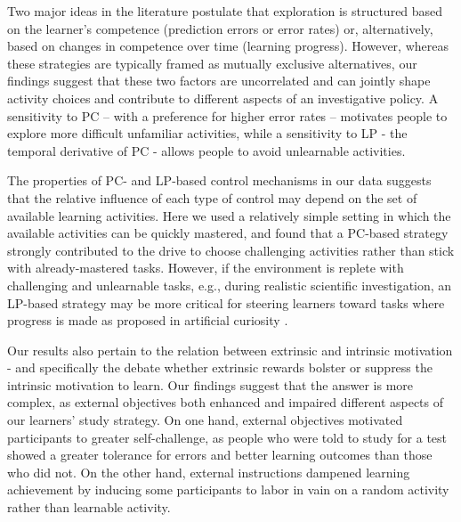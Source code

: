 Two major ideas in the literature postulate that exploration is structured based on the learner’s competence (prediction errors or error rates) or, alternatively, based on changes in competence over time (learning progress). However, whereas these strategies are typically framed as mutually exclusive alternatives, \parencite{kaplan2003motivational,kaplan_search_2007,mirolli_functions_2013,santucci_which_2013} our findings suggest that these two factors are uncorrelated and can jointly shape activity choices and contribute to different aspects of an investigative policy. A sensitivity to \ac{PC} -- with a preference for higher error rates -- motivates people to explore more difficult unfamiliar activities, while a sensitivity to \ac{LP} - the temporal derivative of \ac{PC}  - allows people to avoid unlearnable activities. 

The properties of \ac{PC}- and \ac{LP}-based control mechanisms in our data suggests that the relative influence of each type of control may depend on the set of available learning activities. Here we used a relatively simple setting in which the available activities can be quickly mastered, and found that a \ac{PC}-based strategy strongly contributed to the drive to choose challenging activities rather than stick with already-mastered tasks. However, if the environment is replete with challenging and unlearnable tasks, e.g., during realistic scientific investigation, an \ac{LP}-based strategy may be more critical for steering learners toward tasks where progress is made as proposed in artificial curiosity \parencite{kaplan_search_2007,schmidhuber2010formal,colas_curious_2019}.

Our results also pertain to the relation between extrinsic and intrinsic motivation - and specifically the debate whether extrinsic rewards bolster \parencite{duan2020effect} or suppress \parencite{murayama2019motivated} the intrinsic motivation to learn. Our findings suggest that the answer is more complex, as external objectives both enhanced and impaired different aspects of our learners' study strategy. On one hand, external objectives motivated participants to greater self-challenge, as people who were told to study for a test showed a greater tolerance for errors and better learning outcomes than those who did not. On the other hand, external instructions dampened learning achievement by inducing some participants to labor in vain on a random activity rather than learnable activity.

